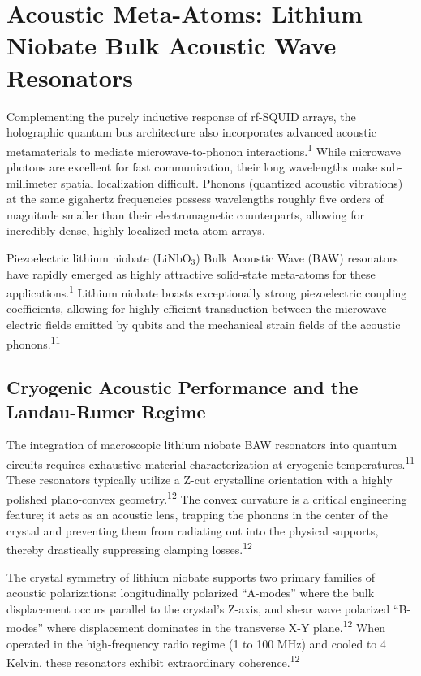 \documentclass[11pt, a4paper]{article}
\begin{document}
\section*{Acoustic Meta-Atoms: Lithium Niobate Bulk Acoustic Wave Resonators}

Complementing the purely inductive response of rf-SQUID arrays, the holographic quantum bus architecture also incorporates advanced acoustic metamaterials to mediate microwave-to-phonon interactions.\textsuperscript{1} While microwave photons are excellent for fast communication, their long wavelengths make sub-millimeter spatial localization difficult. Phonons (quantized acoustic vibrations) at the same gigahertz frequencies possess wavelengths roughly five orders of magnitude smaller than their electromagnetic counterparts, allowing for incredibly dense, highly localized meta-atom arrays.

Piezoelectric lithium niobate ($\text{LiNbO}_3$) Bulk Acoustic Wave (BAW) resonators have rapidly emerged as highly attractive solid-state meta-atoms for these applications.\textsuperscript{1} Lithium niobate boasts exceptionally strong piezoelectric coupling coefficients, allowing for highly efficient transduction between the microwave electric fields emitted by qubits and the mechanical strain fields of the acoustic phonons.\textsuperscript{11}

\subsection*{Cryogenic Acoustic Performance and the Landau-Rumer Regime}

The integration of macroscopic lithium niobate BAW resonators into quantum circuits requires exhaustive material characterization at cryogenic temperatures.\textsuperscript{11} These resonators typically utilize a Z-cut crystalline orientation with a highly polished plano-convex geometry.\textsuperscript{12} The convex curvature is a critical engineering feature; it acts as an acoustic lens, trapping the phonons in the center of the crystal and preventing them from radiating out into the physical supports, thereby drastically suppressing clamping losses.\textsuperscript{12}

The crystal symmetry of lithium niobate supports two primary families of acoustic polarizations: longitudinally polarized ``A-modes'' where the bulk displacement occurs parallel to the crystal's Z-axis, and shear wave polarized ``B-modes'' where displacement dominates in the transverse X-Y plane.\textsuperscript{12} When operated in the high-frequency radio regime (1 to 100 MHz) and cooled to 4 Kelvin, these resonators exhibit extraordinary coherence.\textsuperscript{12}
\end{document}
